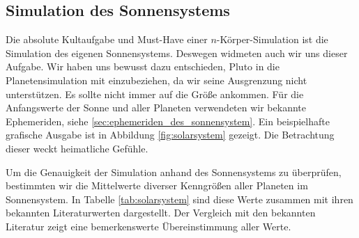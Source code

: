 
  \subsection{Simulation des Sonnensystems} %
  \label{sub:simulation_des_sonnensystems}

    Die absolute Kultaufgabe und Must-Have einer $n$-Körper-Simulation ist die Simulation des eigenen Sonnensystems.
    Deswegen widmeten auch wir uns dieser Aufgabe.
    Wir haben uns bewusst dazu entschieden, Pluto in die Planetensimulation mit einzubeziehen, da wir seine Ausgrenzung nicht unterstützen.
    Es sollte nicht immer auf die Größe ankommen.
    Für die Anfangswerte der Sonne und aller Planeten verwendeten wir bekannte Ephemeriden, siehe \ref{sec:ephemeriden_des_sonnensystem}.
    Ein beispielhafte grafische Ausgabe ist in Abbildung \ref{fig:solarsystem} gezeigt.
    Die Betrachtung dieser weckt heimatliche Gefühle.

    Um die Genauigkeit der Simulation anhand des Sonnensystems zu überprüfen, bestimmten wir die Mittelwerte diverser Kenngrößen aller Planeten im Sonnensystem.
    In Tabelle \ref{tab:solarsystem} sind diese Werte zusammen mit ihren bekannten Literaturwerten dargestellt.
    Der Vergleich mit den bekannten Literatur zeigt eine bemerkenswerte Übereinstimmung aller Werte.

